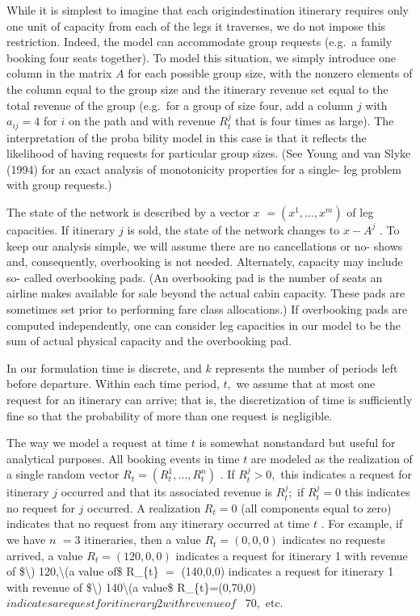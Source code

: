While it is simplest to imagine that each origindestination itinerary
requires only one unit of capacity from each of the legs it traverses,
we do not impose this restriction. Indeed, the model can accommodate
group requests (e.g.~a family booking four seats together). To model
this situation, we simply introduce one column in the matrix \(A\) for
each possible group size, with the nonzero elements of the column equal
to the group size and the itinerary revenue set equal to the total
revenue of the group (e.g.~for a group of size four, add a column \(j\)
with \(a_{ij} = 4\) for \(i\) on the path and with revenue \(R_{t}^{j}\)
that is four times as large). The interpretation of the proba bility
model in this case is that it reflects the likelihood of having requests
for particular group sizes. (See Young and van Slyke (1994) for an exact
analysis of monotonicity properties for a single- leg problem with group
requests.)

The state of the network is described by a vector \(x\)
\(= (x^{1},\ldots ,x^{m})\) of leg capacities. If itinerary \(j\) is
sold, the state of the network changes to \(x - A^{j}\) . To keep our
analysis simple, we will assume there are no cancellations or no- shows
and, consequently, overbooking is not needed. Alternately, capacity may
include so- called overbooking pads. (An overbooking pad is the number
of seats an airline makes available for sale beyond the actual cabin
capacity. These pads are sometimes set prior to performing fare class
allocations.) If overbooking pads are computed independently, one can
consider leg capacities in our model to be the sum of actual physical
capacity and the overbooking pad.

In our formulation time is discrete, and \(k\) represents the number of
periods left before departure. Within each time period, \(t,\) we assume
that at most one request for an itinerary can arrive; that is, the
discretization of time is sufficiently fine so that the probability of
more than one request is negligible.

The way we model a request at time \(t\) is somewhat nonstandard but
useful for analytical purposes. All booking events in time \(t\) are
modeled as the realization of a single random vector
\(R_{t} = (R_{t}^{1},\ldots ,R_{t}^{n})\) . If \(R_{t}^{j} > 0,\) this
indicates a request for itinerary \(j\) occurred and that its associated
revenue is \(R_{t}^{j};\) if \(R_{t}^{j} = 0\) this indicates no request
for \(j\) occurred. A realization \(R_{t} = 0\) (all components equal to
zero) indicates that no request from any itinerary occurred at time
\(t\) . For example, if we have \(n\) \(= 3\) itineraries, then a value
\(R_{t} = (0,0,0)\) indicates no requests arrived, a value
\(R_{t} = (120,0,0)\) indicates a request for itinerary 1 with revenue
of {\$\textbackslash) 120,\textbackslash(a value of\$} R\_\{t\} \(=\)
(140,0,0) indicates a request for itinerary 1 with revenue of
{\$\textbackslash) 140\textbackslash(a value\$} R\_\{t\}=(0,70,0)
\(indicates a request for itinerary 2 with revenue of\) ~\(70,\) etc.

